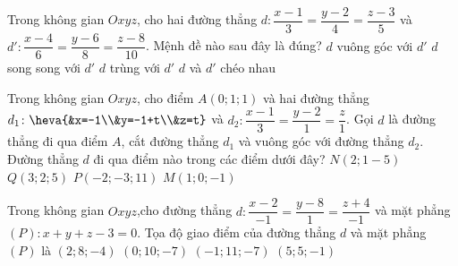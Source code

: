 	\begin{ex}%
	Trong không gian $Oxyz$, cho hai đường thẳng $d: \dfrac{x-1}{3}=\dfrac{y-2}{4}=\dfrac{z-3}{5}$ và $d':\dfrac{x-4}{6}=\dfrac{y-6}{8}=\dfrac{z-8}{10}$. Mệnh đề nào sau đây là đúng?
	\choice 
	{$d$ vuông góc với $d'$}
	{$d$ song song với $d'$}
	{\True $d$ trùng với $d'$}
	{$d$ và $d'$ chéo nhau} 
	\end{ex} 
	\begin{ex}%
	Trong không gian $Oxyz$, cho điểm $A(0;1;1)$ và hai đường thẳng $d_1\colon \heva{&x=-1\\&y=-1+t\\&z=t}$ và $d_2\colon \dfrac{x-1}{3}=\dfrac{y-2}{1}=\dfrac{z}{1}$. Gọi $d$ là đường thẳng đi qua điểm $A$, cắt đường thẳng $d_1$ và vuông góc với đường thẳng $d_2$. Đường thẳng $d$ đi qua điểm nào trong các điểm dưới đây?
	\choice%
	{$N(2;1-5)$}
	{$Q(3;2;5)$}
	{$P(-2;-3;11)$}
	{\True $M(1;0;-1)$}
	\end{ex}
	\begin{ex}%
	Trong không gian $Oxyz$,cho đường thẳng $d\colon \dfrac{x-2}{-1} =\dfrac{y-8}{1} =\dfrac{z+4}{-1}$ và mặt phẳng $(P)\colon x+y+z-3=0$. Tọa độ giao điểm của đường thẳng $d$ và mặt phẳng $(P)$ là
	\choice
	{$(2;8;-4)$}
	{$(0;10;-7)$}
	{\True $(-1;11;-7)$}
	{$(5;5;-1)$}
	\end{ex}
